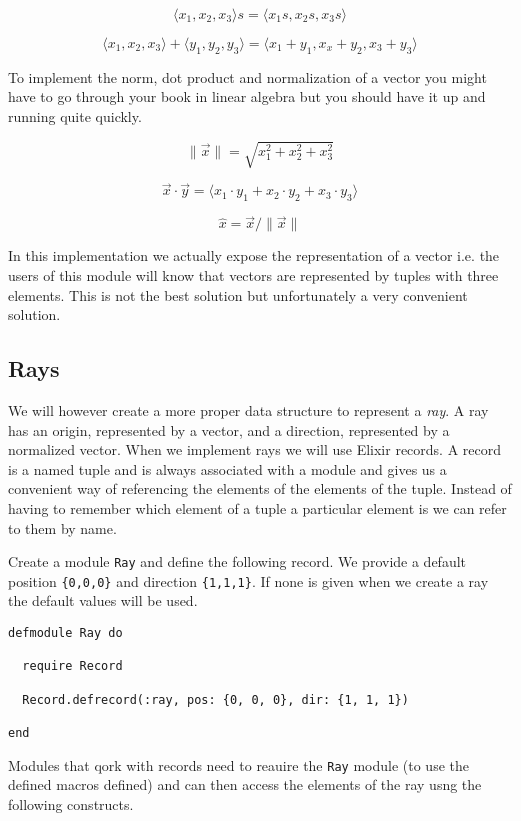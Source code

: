 \documentclass[a4paper,11pt]{article}
\begin{document}
$$\langle x_1, x_2, x_3 \rangle  s =  \langle x_1s, x_2s, x_3s \rangle$$

$$\langle x_1, x_2, x_3 \rangle + \langle y_1, y_2, y_3\rangle = \langle x_1+y_1, x_x+y_2, x_3+y_3 \rangle$$

To implement the norm, dot product and normalization of a vector you
might have to go through your book in linear algebra but you should
have it up and running quite quickly.

$$\|\vec{x}\| = \sqrt{x_1^2 + x_2^2 + x_3^2}$$

$$ \vec{x} \cdot \vec{y} = \langle x_1\cdot y_1 + x_2\cdot y_2 + x_3\cdot y_3\rangle $$ 

$$ \hat{x} = \vec{x}/\|\vec{x}\|$$

In this implementation we actually expose the representation of a
vector i.e. the users of this module will know that vectors are
represented by tuples with three elements. This is not the best
solution but unfortunately a very convenient solution.

\subsection*{Rays}

We will however create a more proper data structure to represent a {\em ray}. 
A ray has an origin, represented by a vector, and a direction,
represented by a normalized vector. When we implement rays we will use
Elixir records. A record is a named tuple and is always associated with a module and gives
us a convenient way of referencing the elements of the elements of the tuple. Instead
of having to remember which element of a tuple a particular element
is we can refer to them by name. 

Create a module {\tt Ray} and define the following record. We provide
a default position {\tt \{0,0,0\}} and direction {\tt \{1,1,1\}}. If
none is given when we create a ray the default values will be used.

\begin{verbatim}
defmodule Ray do

  require Record

  Record.defrecord(:ray, pos: {0, 0, 0}, dir: {1, 1, 1})
  
end
\end{verbatim}

Modules that qork with records need to reauire the {\tt Ray} module
(to use the defined macros defined) and can then access the elements
of the ray usng the following constructs.
\end{document}

